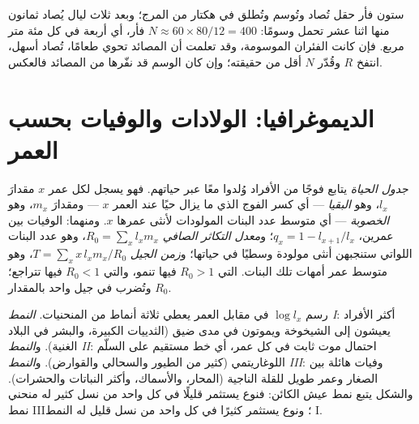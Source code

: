\begin{example}\label{ex:b1:populations:voles}
ستون فأر حقل تُصاد وتُوسم وتُطلق في هكتار من المرج؛ وبعد ثلاث ليال
يُصاد ثمانون منها اثنا عشر تحمل وسومًا:
$N \approx 60\times 80/12 = 400$ فأر، أي أربعة في كل مئة متر مربع.
فإن كانت الفئران الموسومة، وقد تعلمت أن المصائد تحوي طعامًا، تُصاد
أسهل، انتفخ $R$ وقُدّر $N$ أقل من حقيقته؛ وإن كان الوسم قد نفّرها
من المصائد فالعكس.
\end{example}

\section{الديموغرافيا: الولادات والوفيات بحسب العمر}

\begin{definition}\label{def:b1:populations:lifetable}
\emph{جدول الحياة} يتابع فوجًا من الأفراد وُلدوا معًا عبر حياتهم.
فهو يسجل لكل عمر $x$ مقدارَ $l_x$، وهو \emph{البقيا} --- أي كسر
الفوج الذي ما يزال حيًا عند العمر $x$ --- ومقدارَ $m_x$، وهو
\emph{الخصوبة} --- أي متوسط عدد البنات المولودات لأنثى عمرها $x$.
ومنهما: الوفيات بين عمرين، $q_x = 1 - l_{x+1}/l_x$؛ و\emph{معدل
التكاثر الصافي} $R_0 = \sum_x l_x m_x$، وهو عدد البنات اللواتي
ستنجبهن أنثى مولودة وسطيًا في حياتها؛ و\emph{زمن الجيل}
$T = \sum_x x\,l_x m_x / R_0$، وهو متوسط عمر أمهات تلك البنات.
 التي $R_0 > 1$ فيها تنمو، والتي $R_0 < 1$ فيها تتراجع؛
وتُضرب في جيل واحد بالمقدار $R_0$.
\end{definition}

\begin{proposition}\label{prop:b1:populations:survivorship}
رسم $\log l_x$ في مقابل العمر يعطي ثلاثة أنماط من المنحنيات.
\emph{النمط I}: أكثر الأفراد يعيشون إلى الشيخوخة ويموتون في مدى
ضيق (الثدييات الكبيرة، والبشر في البلاد الغنية). و\emph{النمط II}:
احتمال موت ثابت في كل عمر، أي خط مستقيم على السلّم اللوغاريتمي
(كثير من الطيور والسحالي والقوارض). و\emph{النمط III}: وفيات هائلة
بين الصغار وعمر طويل للقلة الناجية (المحار، والأسماك، وأكثر
النباتات والحشرات). والشكل يتبع نمط عيش الكائن: فنوع يستثمر قليلًا
في كل واحد من نسل كثير له منحني نمط III؛ ونوع يستثمر كثيرًا في كل
واحد من نسل قليل له النمط I.
\end{proposition}

